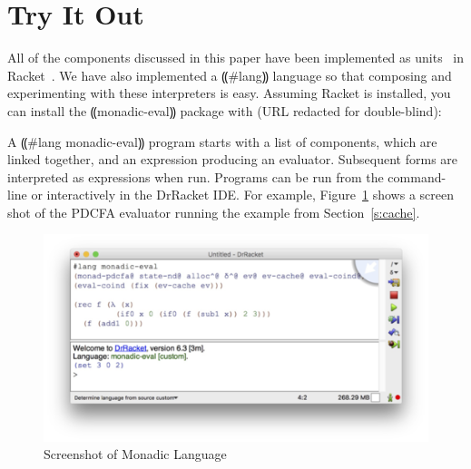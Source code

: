 \section{Try It Out}\label{s:try-it}

All of the components discussed in this paper have been implemented as
units~\cite{local:flatt-pldi98} in Racket~\cite{dvanhorn:plt-tr1}.  We have
also implemented a ⸨#lang⸩ language so that composing and experimenting with
these interpreters is easy.  Assuming Racket is installed, you can install the
⸨monadic-eval⸩ package with (URL redacted for double-blind):

A ⸨#lang monadic-eval⸩ program starts with a list of
components, which are linked together, and an expression producing an
evaluator.  Subsequent forms are interpreted as expressions when run.
Programs can be run from the command-line or interactively in the
DrRacket IDE.  For example, Figure~\ref{f:screen} shows a screen shot of the PDCFA
evaluator running the example from Section~\ref{s:cache}.

\begin{figure}
\includegraphics[width=\linewidth]{screen.png}
\caption{Screenshot of Monadic Language}
\label{f:screen}
\end{figure}
